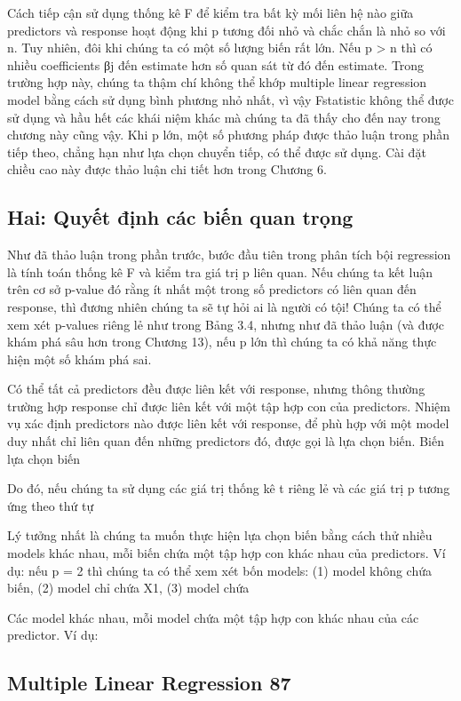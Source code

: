 Cách tiếp cận sử dụng thống kê F để kiểm tra bất kỳ mối liên hệ nào giữa predictors và response hoạt động khi p tương đối nhỏ và chắc chắn là nhỏ so với n. Tuy nhiên, đôi khi chúng ta có một số lượng biến rất lớn. Nếu p > n thì có nhiều coefficients βj đến estimate hơn số quan sát từ đó đến estimate. Trong trường hợp này, chúng ta thậm chí không thể khớp multiple linear regression model bằng cách sử dụng bình phương nhỏ nhất, vì vậy Fstatistic không thể được sử dụng và hầu hết các khái niệm khác mà chúng ta đã thấy cho đến nay trong chương này cũng vậy. Khi p lớn, một số phương pháp được thảo luận trong phần tiếp theo, chẳng hạn như lựa chọn chuyển tiếp, có thể được sử dụng. Cài đặt chiều cao này được thảo luận chi tiết hơn trong Chương 6.

\subsection{Hai: Quyết định các biến quan trọng}

Như đã thảo luận trong phần trước, bước đầu tiên trong phân tích bội regression là tính toán thống kê F và kiểm tra giá trị p liên quan. Nếu chúng ta kết luận trên cơ sở p-value đó rằng ít nhất một trong số predictors có liên quan đến response, thì đương nhiên chúng ta sẽ tự hỏi ai là người có tội! Chúng ta có thể xem xét p-values riêng lẻ như trong Bảng 3.4, nhưng như đã thảo luận (và được khám phá sâu hơn trong Chương 13), nếu p lớn thì chúng ta có khả năng thực hiện một số khám phá sai.

Có thể tất cả predictors đều được liên kết với response, nhưng thông thường trường hợp response chỉ được liên kết với một tập hợp con của predictors. Nhiệm vụ xác định predictors nào được liên kết với response, để phù hợp với một model duy nhất chỉ liên quan đến những predictors đó, được gọi là lựa chọn biến. Biến lựa chọn biến

Do đó, nếu chúng ta sử dụng các giá trị thống kê t riêng lẻ và các giá trị p tương ứng theo thứ tự

Lý tưởng nhất là chúng ta muốn thực hiện lựa chọn biến bằng cách thử nhiều models khác nhau, mỗi biến chứa một tập hợp con khác nhau của predictors. Ví dụ: nếu p = 2 thì chúng ta có thể xem xét bốn models: (1) model không chứa biến, (2) model chỉ chứa X1, (3) model chứa

Các model khác nhau, mỗi model chứa một tập hợp con khác nhau của các predictor. Ví dụ:

\subsection{Multiple Linear Regression 87}

